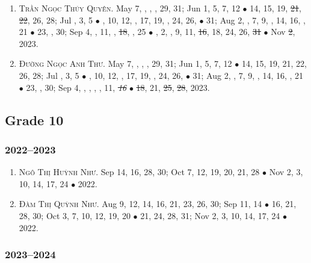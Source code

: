 \documentclass{article}
\begin{document}
\begin{enumerate}
	\item \textsc{Trần Ngọc Thúy Quyên.} May 7, , , , 29, 31; Jun 1, 5, 7, 12 $\bullet$ 14, 15, 19, \st{21}, \st{22}, 26, 28; Jul , 3, 5 $\bullet$ , 10, 12, , 17, 19, , 24, 26,  $\bullet$ 31; Aug 2, , 7, 9, , 14, 16, , 21 $\bullet$ 23, , 30; Sep 4, , 11, , \st{18}, , 25 $\bullet$ , 2, , 9, 11, \st{16}, 18, 24, 26, \st{31} $\bullet$ Nov \st{2}, 2023.
	\item \textsc{Đường Ngọc Anh Thư.} May 7, , , , 29, 31; Jun 1, 5, 7, 12 $\bullet$ 14, 15, 19, 21, 22, 26, 28; Jul , 3, 5 $\bullet$ , 10, 12, , 17, 19, , 24, 26,  $\bullet$ 31; Aug 2, , 7, 9, , 14, 16, , 21 $\bullet$ 23, , 30; Sep 4, , , , , 11, \st{\it16} $\bullet$ \st{18}, 21, \st{25}, \st{28}, 2023. {\sf[Out]}
\end{enumerate}


\subsection{Grade 10}

\subsubsection{2022--2023}

\begin{enumerate}
	\item \textsc{Ngô Thị Huỳnh Như.} {\sf[In]} Sep 14, 16, 28, 30; Oct 7, 12, 19, 20, 21, 28 $\bullet$ Nov 2, 3, 10, 14, 17, 24 $\bullet$ 2022. {\sf[Out]}
	\item \textsc{Đàm Thị Quỳnh Như.} {\sf[In]} Aug 9, 12, 14, 16, 21, 23, 26, 30; Sep 11, 14 $\bullet$ 16, 21, 28, 30; Oct 3, 7, 10, 12, 19, 20 $\bullet$ 21, 24, 28, 31; Nov 2, 3, 10, 14, 17, 24 $\bullet$ 2022. {\sf[Out]}
\end{enumerate}

\subsubsection{2023--2024}

\end{document}
